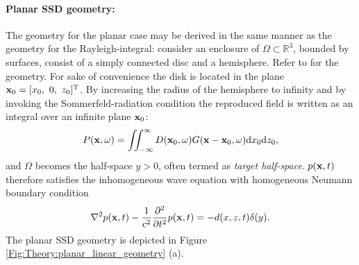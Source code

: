 \paragraph{Planar SSD geometry:}
The geometry for the planar case may be derived in the same manner as the geometry for the Rayleigh-integral: consider an enclosure of $\Omega \subset \mathbb{R}^3$, bounded by surfaces, consist of a simply connected disc and a hemisphere. Refer to \cite[p.~84,p.~275]{Ahrens2012, Williams1999} for the geometry. For sake of convenience the disk is located in the plane $\mathbf{x}_0 = [x_0,\ 0,\ z_0]^{\mathrm{T}}$. By increasing the radius of the hemisphere to infinity and by invoking the Sommerfeld-radiation condition the reproduced field is written as an integral over an infinite plane $\mathbf{x}_0$:
\begin{equation}
P(\mathbf{x},\omega) = \iint_{-\infty}^{\infty} D(\mathbf{x}_0,\omega) G(\mathbf{x} - \mathbf{x}_0 , \omega ) \mathrm{d} x_0 \mathrm{d} z_0,
\label{Eq:Theory:3D_planar_SFS}
\end{equation}
and $\Omega$ becomes the half-space $y>0$, often termed as \emph{target half-space}.
$p(\mathbf{x},t)$ therefore satisfies the inhomogeneous wave equation with homogeneous Neumann boundary condition
\begin{equation}
\nabla^2 p(\mathbf{x},t) - \frac{1}{c^2}\frac{\partial^2}{\partial t^2} p(\mathbf{x},t) = - d(x,z,t)\delta(y).
\label{Eq:Theory:3D_planar_SFS_time}
\end{equation}
The planar SSD geometry is depicted in Figure \ref{Fig:Theory:planar_linear_geometry} (a).

